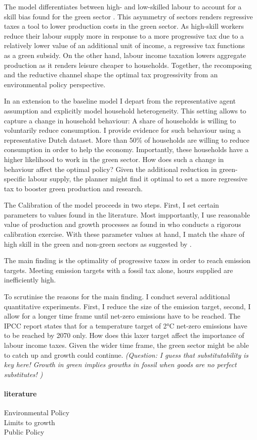 The model differentiates between high- and low-skilled labour to account for a skill bias found for the green sector \citep{Consoli2016DoCapital}. This asymmetry of sectors renders regressive taxes a tool to lower production costs in the green sector. As high-skill workers reduce their labour supply more in response to a more progressive tax due to a relatively lower value of an additional unit of income, a regressive tax functions as a green subsidy. %
On the other hand, labour income taxation lowers aggregate production as it renders leisure cheaper to households. 
Together, the recomposing and the reductive channel shape the optimal tax progressivity from an environmental policy perspective. 

In an extension to the baseline model I depart from the representative agent assumption and explicitly model household heterogeneity. This setting allows to capture a change in household behaviour: A share of households is willing to voluntarily reduce consumption. I provide evidence for such behaviour using a representative Dutch dataset. More than 50\% of households are willing to reduce consumption in order to help the economy. Importantly, these households have a higher likelihood to work in the green sector. How does such a change in behaviour affect the optimal policy? Given the additional reduction in green-specific labour supply, the planner might find it optimal to set a more regressive tax to booster green production and research.    

The Calibration of the model proceeds in two steps. First, I set certain parameters to values found in the literature. Most impportantly, I use reasonable value of production and growth processes as found in \cite{Fried2018ClimateAnalysis} who conducts a rigorous calibration exercise.  With these parameter values at hand, I match the share of high skill in the green and non-green sectors as suggested by \cite{Consoli2016DoCapital}. 

The main finding is the optimality of progressive taxes in order to reach emission targets. 
Meeting emission targets with a fossil tax alone, hours supplied are inefficiently high. 

To scrutinise the reasons for the main finding. I conduct several additional quantitative experiments. First, I reduce the size of the emission target, second, I allow for a longer time frame until net-zero emissions have to be reached. The IPCC report states that for a temperature target of 2°C net-zero emissions have to be reached by 2070 only. How does this laxer target affect the importance of labour income taxes. Given the wider time frame, the green sector might be able to catch up and growth could continue. \textit{(Question: I guess that substitutability is key here! Growth in green implies growths in fossil when goods are no perfect substitutes! )}

\paragraph{literature}
{Environmental Policy}
\\
{Limits to growth}
\\{Public Policy}